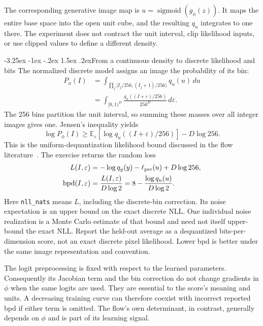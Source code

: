 \documentclass[11pt,a4paper]{article}
\makeatletter
\newcommand{\E}{\mathbb E}
\newcommand{\dd}{\,d}
\renewcommand\subsection{\@startsection{subsection}{2}{\z@}%
  {-3.25ex \@plus -1ex \@minus -.2ex}%
  {1.5ex \@plus .2ex}{\normalfont\large}}
\makeatother
\begin{document}
The corresponding generative image map is
$u=\operatorname{sigmoid}(g_\phi(z))$. It maps the entire base space into the
open unit cube, and the resulting $q_u$ integrates to one there. The experiment
does not contract the unit interval, clip likelihood inputs, or use clipped
values to define a different density.

\subsection{From a continuous density to discrete likelihood and bits}
The normalized discrete model assigns an image the probability of its bin:
\begin{align*}
 P_\phi(I)
 &=\int_{\prod_j[I_j/256,(I_j+1)/256)}q_u(u)\dd u\\
 &=\int_{[0,1)^D}\frac{q_u((I+\varepsilon)/256)}{256^D}\dd\varepsilon.
\end{align*}
The 256 bins partition the unit interval, so summing these masses over all
integer images gives one. Jensen's inequality yields
\[
 \log P_\phi(I)
 \geq\E_\varepsilon[\log q_u((I+\varepsilon)/256)]-D\log256.
\]
This is the uniform-dequantization likelihood bound discussed in the flow
literature~\cite{realnvp,flowpp}. The exercise returns the random loss
\begin{align*}
 L(I,\varepsilon)
 &=-\log q_y(y)-\ell_{\rm pre}(u)+D\log256,\\
 \operatorname{bpd}(I,\varepsilon)
 &=\frac{L(I,\varepsilon)}{D\log2}
 =8-\frac{\log q_u(u)}{D\log2}.
\end{align*}
Here \texttt{nll\_nats} means $L$, including the discrete-bin correction.
Its noise expectation is an upper bound on the exact discrete NLL. One
individual noise realization is a Monte Carlo estimate of that bound and need
not itself upper-bound the exact NLL. Report the held-out average as a
dequantized bits-per-dimension score, not an exact discrete pixel likelihood.
Lower bpd is better under the same image representation and convention.

The logit preprocessing is fixed with respect to the learned parameters.
Consequently its Jacobian term and the bin correction do not change gradients
in $\phi$ when the same logits are used. They are essential to the score's
meaning and units. A decreasing training curve can therefore coexist with
incorrect reported bpd if either term is omitted. The flow's own determinant,
in contrast, generally depends on $\phi$ and is part of its learning signal.
\end{document}
